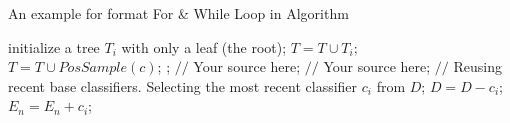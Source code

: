 \documentclass[11pt]{ctexart}
\begin{document}
  
	\begin{algorithm}[h]  
		\caption{An example for format For \& While Loop in Algorithm}  
		\begin{algorithmic}[1]  
			\State initialize a tree $T_{i}$ with only a leaf (the root);  
			\State $T=T\cup T_{i};$  
			\EndFor  
			\label{code:TrainBase:getc}  
			\State $T=T\cup PosSample(c)$;  
			\label{code:TrainBase:pos}  
			\EndFor;  
			\State $//$ Your source here;  
			\EndFor  
			\State $//$ Your source here;  
			\EndFor  
			\State $//$ Reusing recent base classifiers.  
			\label{code:recentStart}  
			\State Selecting the most recent classifier $c_i$ from $D$;  
			\State $D=D-c_i$;  
			\State $E_n=E_n+c_i$;  
			\EndWhile  
			\label{code:recentEnd}  
		\end{algorithmic}  
	\end{algorithm}  
\end{document}
